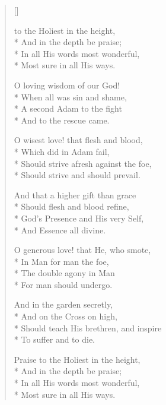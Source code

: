 \newHymn
{}

\begin{verse}[\versewidth]

\begin{altverse}
 to the Holiest in the height,\\*
And in the depth be praise;\\*
In all His words most wonderful,\\*
Most sure in all His ways.
\end{altverse}

\begin{altverse}
O loving wisdom of our God!\\*
When all was sin and shame,\\*
A second Adam to the fight\\*
And to the rescue came.
\end{altverse}

\begin{altverse}
O wisest love! that flesh and blood,\\*
Which did in Adam fail,\\*
Should strive afresh against the foe,\\*
Should strive and should prevail.
\end{altverse}

\begin{altverse}
And that a higher gift than grace\\*
Should flesh and blood refine,\\*
God’s Presence and His very Self,\\*
And Essence all divine.
\end{altverse}

\begin{altverse}
O generous love! that He, who smote,\\*
In Man for man the foe,\\*
The double agony in Man\\*
For man should undergo.
\end{altverse}

\begin{altverse}
And in the garden secretly,\\*
And on the Cross on high,\\*
Should teach His brethren, and inspire\\*
To suffer and to die.
\end{altverse}

\begin{altverse}
Praise to the Holiest in the height,\\*
And in the depth be praise;\\*
In all His words most wonderful,\\*
Most sure in all His ways.
\end{altverse}

\end{verse}

